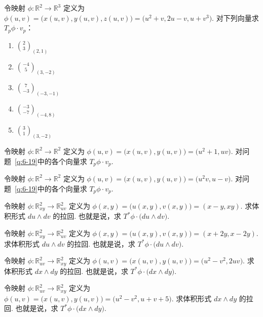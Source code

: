 \begin{question}\label{q:6-19}
令映射 $\phi:\mathbb{R}^2\to\mathbb{R}^3$ 定义为 $\phi(u,v)=\bigl(x(u,v),y(u,v),z(u,v)\bigr)=\bigl(u^2+v,2u-v,u+v^3\bigr)$. 对下列向量求 $T_p\phi\cdot v_p$：
\begin{enumerate}
  \item[(a)] $\binom{2}{3}_{(2,1)}$
  \item[(b)] $\binom{-4}{5}_{(3,-2)}$
  \item[(c)] $\binom{7}{-3}_{(-3,-1)}$
  \item[(d)] $\binom{-3}{-7}_{(-4,8)}$
  \item[(e)] $\binom{3}{1}_{(3,-2)}$
\end{enumerate}
\end{question}

\begin{question}\label{q:6-20}
令映射 $\phi:\mathbb{R}^2\to\mathbb{R}^2$ 定义为 $\phi(u,v)=\bigl(x(u,v),y(u,v)\bigr)=\bigl(u^2+1,uv\bigr)$. 对问题~\ref{q:6-19}中的各个向量求 $T_p\phi\cdot v_p$.
\end{question}

\begin{question}\label{q:6-21}
令映射 $\phi:\mathbb{R}^2\to\mathbb{R}^2$ 定义为 $\phi(u,v)=\bigl(x(u,v),y(u,v)\bigr)=\bigl(u^2v,u-v\bigr)$. 对问题~\ref{q:6-19}中的各个向量求 $T_p\phi\cdot v_p$.
\end{question}

\begin{question}\label{q:6-22}
令映射 $\phi:\mathbb{R}^2_{xy}\to\mathbb{R}^2_{uv}$ 定义为 $\phi(x,y)=\bigl(u(x,y),v(x,y)\bigr)=(x-y,xy)$. 求体积形式 $du\wedge dv$ 的拉回. 也就是说，求 $T^*\phi\cdot\bigl(du\wedge dv\bigr)$.
\end{question}

\begin{question}\label{q:6-23}
令映射 $\phi:\mathbb{R}^2_{xy}\to\mathbb{R}^2_{uv}$ 定义为 $\phi(x,y)=\bigl(u(x,y),v(x,y)\bigr)=(x+2y,x-2y)$. 求体积形式 $du\wedge dv$ 的拉回. 也就是说，求 $T^*\phi\cdot\bigl(du\wedge dv\bigr)$.
\end{question}

\begin{question}\label{q:6-24}
令映射 $\phi:\mathbb{R}^2_{uv}\to\mathbb{R}^2_{xy}$ 定义为 $\phi(u,v)=\bigl(x(u,v),y(u,v)\bigr)=\bigl(u^2-v^2,2uv\bigr)$. 求体积形式 $dx\wedge dy$ 的拉回. 也就是说，求 $T^*\phi\cdot\bigl(dx\wedge dy\bigr)$.
\end{question}

\begin{question}\label{q:6-25}
令映射 $\phi:\mathbb{R}^2_{uv}\to\mathbb{R}^2_{xy}$ 定义为 $\phi(u,v)=\bigl(x(u,v),y(u,v)\bigr)=\bigl(u^2-v^2,u+v+5\bigr)$. 求体积形式 $dx\wedge dy$ 的拉回. 也就是说，求 $T^*\phi\cdot\bigl(dx\wedge dy\bigr)$.
\end{question}

